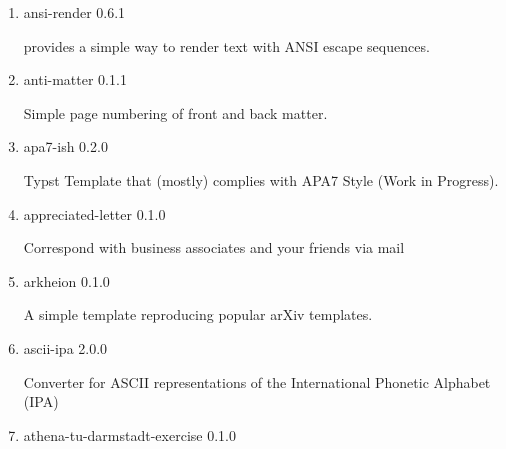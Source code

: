 \begin{enumerate}
  { anatomy } { 0.1.1 }

  Anatomy of a Font. Visualise metrics.
\item
  \href{/universe/package/ansi-render/}{}

  { ansi-render } { 0.6.1 }

  provides a simple way to render text with ANSI escape sequences.
\item
  \href{/universe/package/anti-matter/}{}

  { anti-matter } { 0.1.1 }

  Simple page numbering of front and back matter.
\item
  \href{/universe/package/apa7-ish/}{}


  { apa7-ish } { 0.2.0 }

  Typst Template that (mostly) complies with APA7 Style (Work in
  Progress).
\item
  \href{/universe/package/appreciated-letter/}{}


  { appreciated-letter } { 0.1.0 }

  Correspond with business associates and your friends via mail
\item
  \href{/universe/package/arkheion/}{}


  { arkheion } { 0.1.0 }

  A simple template reproducing popular arXiv templates.
\item
  \href{/universe/package/ascii-ipa/}{}

  { ascii-ipa } { 2.0.0 }

  Converter for ASCII representations of the International Phonetic
  Alphabet (IPA)
\item
  \href{/universe/package/athena-tu-darmstadt-exercise/}{}


  { athena-tu-darmstadt-exercise } { 0.1.0 }


\end{enumerate}
